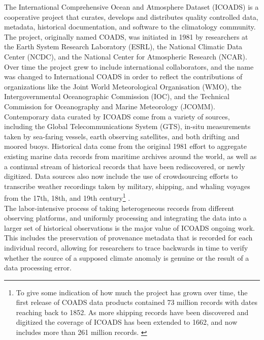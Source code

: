 \documentclass[thesis,tocnosub,noragright,centerchapter,12pt]{uiucecethesis09}
\begin{document}
The International Comprehensive Ocean and Atmosphere Dataset (ICOADS) is
a cooperative project that curates, develops and distributes quality controlled
data, metadata, historical documentation, and software to the
climatology community. The project, originally named COADS, was
initiated in 1981 by researchers at the Earth System Research Laboratory
(ESRL), the National Climatic Data Center (NCDC), and the National
Center for Atmospheric Research (NCAR). Over time the project grew to
include international collaborators, and the name was changed to
International COADS in order to reflect the contributions of organizations like
the Joint World Meteorological Organisation (WMO), the Intergovernmental
Oceanographic Commission (IOC), and the Technical Commission for
Oceanography and Marine Meteorology (JCOMM).\\

Contemporary data curated by ICOADS come from a variety of sources,
including the Global Telecommunications System (GTS), in-situ
measurements taken by sea-faring vessels, earth observing satellites,
and both drifting and moored buoys. Historical data come from the
original 1981 effort to aggregate existing marine data records from
maritime archives around the world, as well as a continual stream of
historical records that have been rediscovered, or newly digitized. Data sources also now include the use of crowdsourcing efforts to transcribe weather recordings taken by military, shipping,
and whaling voyages from the 17th, 18th, and 19th century\footnote{To give some indication of how much the project has grown over time, the
first release of COADS data products contained 73 million records with
dates reaching back to 1852. As more shipping records have been
discovered and digitized the coverage of ICOADS has been extended to
1662, and now includes more than 261 million records. \citep{woodruff2011icoads}} \citep{brohan2009marine}.\\

The labor-intensive process of taking heterogeneous records from
different observing platforms, and uniformly processing and integrating the
data into a larger set of historical observations is the major value of
ICOADS ongoing work. This includes the preservation of provenance
metadata that is recorded for each individual record, allowing for
researchers to trace backwards in time to verify whether the source of a
supposed climate anomaly is genuine or the result of a data processing
error.\\
\end{document}
